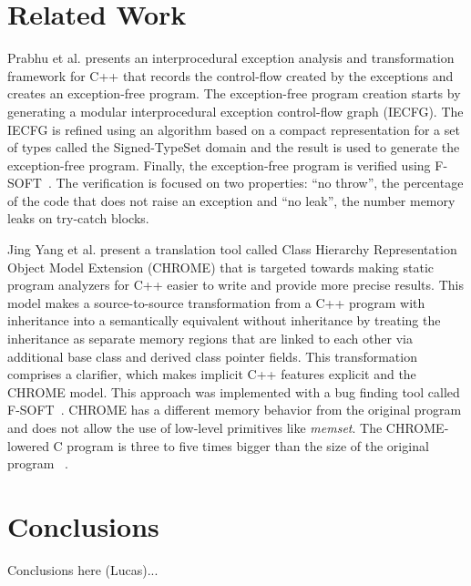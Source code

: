 \documentclass[a4paper]{llncs}
\begin{document}
\section{Related Work}

Prabhu et al. presents an interprocedural exception 
analysis and transformation framework for C++ that 
records the control-flow created by the exceptions 
and creates an exception-free program. The exception-free 
program creation starts by generating a modular interprocedural 
exception control-flow graph (IECFG). The IECFG is refined using 
an algorithm based on a compact representation for a set of types 
called the Signed-TypeSet domain and the result is used 
to generate the exception-free program. Finally, the exception-free 
program is verified using F-SOFT~\cite{Fsoft}. The verification is 
focused on two properties: ``no throw'', the percentage of the code 
that does not raise an exception and ``no leak'', the number memory 
leaks on try-catch blocks.~\cite{PrabhuMBIG11}

Jing Yang et al. present a translation tool called Class Hierarchy 
Representation Object Model Extension (CHROME) that is targeted towards 
making static program analyzers for C++ easier to write and provide 
more precise results. This model makes a source-to-source transformation 
from a C++ program with inheritance into a semantically equivalent without 
inheritance by treating the inheritance as separate memory regions 
that are linked to each other via additional base class and derived class 
pointer fields. This transformation comprises a clarifier, which makes 
implicit C++ features explicit and the CHROME model. This approach was 
implemented with a bug finding tool called F-SOFT~\cite{Fsoft}. CHROME has a 
different memory behavior from the original program and does not allow the use 
of low-level primitives like \textit{memset}. The CHROME-lowered C program is 
three to five times bigger than the size of the original program ~\cite{Yang12}.

\section{Conclusions}
%
Conclusions here (Lucas)...


%
\end{document}
